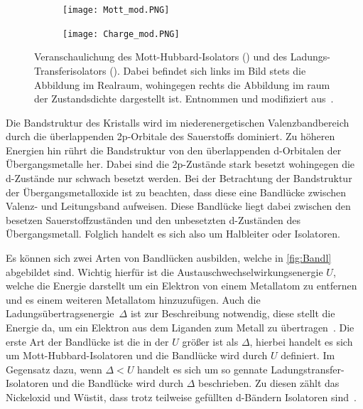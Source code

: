         \begin{figure}
            \centering
            \begin{subfigure}{0.48\textwidth}
                \centering
                \texttt{[image: Mott\_mod.PNG]}
                \subcaption{}
                \label{fig:Mott}
            \end{subfigure}
            \begin{subfigure}{0.48\textwidth}
                \centering
                \texttt{[image: Charge\_mod.PNG]}
                \subcaption{}
                \label{fig:Charge}
            \end{subfigure}
            \label{fig:Bandl}
            \caption{Veranschaulichung des Mott-Hubbard-Isolators () und des Ladungs-Transferisolators ().
            Dabei befindet sich links im Bild stets die Abbildung im Realraum, wohingegen rechts die Abbildung im raum der Zustandsdichte dargestellt ist.
            Entnommen und modifiziert aus~\cite{stohr_magnetism_2006}.}
        \end{figure}
        Die Bandstruktur des Kristalls wird im niederenergetischen Valenzbandbereich durch die überlappenden 2p-Orbitale des Sauerstoffs dominiert.
        Zu höheren Energien hin rührt die Bandstruktur von den überlappenden d-Orbitalen der Übergangsmetalle her.
        Dabei sind die 2p-Zustände stark besetzt wohingegen die d-Zustände nur schwach besetzt werden.
        Bei der Betrachtung der Bandstruktur der Übergangsmetalloxide ist zu beachten, dass diese eine Bandlücke zwischen Valenz- und Leitungsband aufweisen.
        Diese Bandlücke liegt dabei zwischen den besetzen Sauerstoffzuständen und den unbesetzten d-Zuständen des Übergangsmetall.
        Folglich handelt es sich also um Halbleiter oder Isolatoren.

        Es können sich zwei Arten von Bandlücken ausbilden, welche in \autoref{fig:Bandl} abgebildet sind.
        Wichtig hierfür ist die Austauschwechselwirkungsenergie $U$, welche die Energie darstellt um ein Elektron von einem Metallatom zu entfernen und es einem weiteren Metallatom hinzuzufügen.
        Auch die Ladungsübertragsenergie~$\Delta$ ist zur Beschreibung notwendig, diese stellt die Energie da, um ein Elektron aus dem Liganden zum Metall zu übertragen~\cite{stohr_magnetism_2006}.
        Die erste Art der Bandlücke ist die in der $U$ größer ist als $\Delta$, hierbei handelt es sich um Mott-Hubbard-Isolatoren und die Bandlücke wird durch $U$ definiert.
        Im Gegensatz dazu, wenn $\Delta < U$ handelt es sich um so gennate Ladungstransfer-Isolatoren und die Bandlücke wird durch $\Delta$ beschrieben.
        Zu diesen zählt das Nickeloxid und Wüstit, dass trotz teilweise gefüllten d-Bändern Isolatoren sind~\cite{IF_5}.

